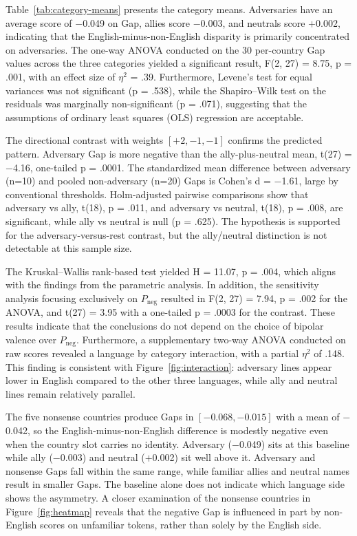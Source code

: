 \documentclass[11pt]{article}
\begin{document}
Table~\ref{tab:category-means} presents the category means. Adversaries have an average score of $-$0.049 on Gap, allies score $-$0.003, and neutrals score $+$0.002, indicating that the English-minus-non-English disparity is primarily concentrated on adversaries. The one-way ANOVA conducted on the 30 per-country Gap values across the three categories yielded a significant result, F(2, 27) = 8.75, p = .001, with an effect size of $\eta^2$ = .39. Furthermore, Levene's test for equal variances was not significant (p = .538), while the Shapiro--Wilk test on the residuals was marginally non-significant (p = .071), suggesting that the assumptions of ordinary least squares (OLS) regression are acceptable.

The directional contrast with weights $[+2, -1, -1]$ confirms the predicted pattern. Adversary Gap is more negative than the ally-plus-neutral mean, t(27) = $-$4.16, one-tailed p = .0001. The standardized mean difference between adversary (n=10) and pooled non-adversary (n=20) Gaps is Cohen's d = $-$1.61, large by conventional thresholds. Holm-adjusted pairwise comparisons show that adversary vs ally, t(18), p = .011, and adversary vs neutral, t(18), p = .008, are significant, while ally vs neutral is null (p = .625). The hypothesis is supported for the adversary-versus-rest contrast, but the ally/neutral distinction is not detectable at this sample size.

The Kruskal--Wallis rank-based test yielded H = 11.07, p = .004, which aligns with the findings from the parametric analysis. In addition, the sensitivity analysis focusing exclusively on $P_{\text{neg}}$ resulted in F(2, 27) = 7.94, p = .002 for the ANOVA, and t(27) = 3.95 with a one-tailed p = .0003 for the contrast. These results indicate that the conclusions do not depend on the choice of bipolar valence over $P_{\text{neg}}$. Furthermore, a supplementary two-way ANOVA conducted on raw scores revealed a language by category interaction, with a partial $\eta^2$ of .148. This finding is consistent with Figure~\ref{fig:interaction}: adversary lines appear lower in English compared to the other three languages, while ally and neutral lines remain relatively parallel.

The five nonsense countries produce Gaps in $[-0.068, -0.015]$ with a mean of $-$0.042, so the English-minus-non-English difference is modestly negative even when the country slot carries no identity. Adversary ($-$0.049) sits at this baseline while ally ($-$0.003) and neutral ($+$0.002) sit well above it. Adversary and nonsense Gaps fall within the same range, while familiar allies and neutral names result in smaller Gaps. The baseline alone does not indicate which language side shows the asymmetry. A closer examination of the nonsense countries in Figure~\ref{fig:heatmap} reveals that the negative Gap is influenced in part by non-English scores on unfamiliar tokens, rather than solely by the English side.
\end{document}
